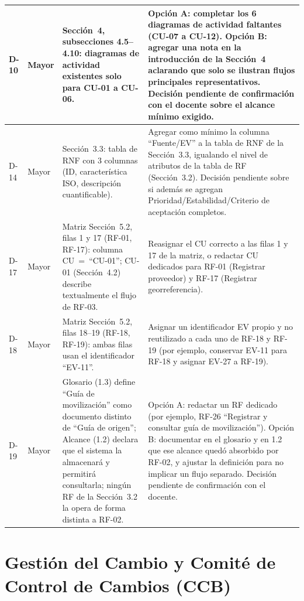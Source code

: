 \documentclass[11pt,a4paper]{article}
\begin{document}
\begin{longtable}{|p{0.8cm}|p{1.1cm}|p{5.7cm}|p{5.7cm}|}
\hline
D-10 & Mayor & Sección~4, subsecciones 4.5--4.10: diagramas de actividad existentes solo para CU-01 a CU-06. & Opción A: completar los 6 diagramas de actividad faltantes (CU-07 a CU-12). Opción B: agregar una nota en la introducción de la Sección~4 aclarando que solo se ilustran flujos principales representativos. Decisión pendiente de confirmación con el docente sobre el alcance mínimo exigido. \\
\hline
D-14 & Mayor & Sección~3.3: tabla de RNF con 3 columnas (ID, característica ISO, descripción cuantificable). & Agregar como mínimo la columna ``Fuente/EV'' a la tabla de RNF de la Sección~3.3, igualando el nivel de atributos de la tabla de RF (Sección~3.2). Decisión pendiente sobre si además se agregan Prioridad/Estabilidad/Criterio de aceptación completos. \\
\hline
D-17 & Mayor & Matriz Sección~5.2, filas 1 y 17 (RF-01, RF-17): columna CU~=~``CU-01''; CU-01 (Sección~4.2) describe textualmente el flujo de RF-03. & Reasignar el CU correcto a las filas 1 y 17 de la matriz, o redactar CU dedicados para RF-01 (Registrar proveedor) y RF-17 (Registrar georreferencia). \\
\hline
D-18 & Mayor & Matriz Sección~5.2, filas 18--19 (RF-18, RF-19): ambas filas usan el identificador ``EV-11''. & Asignar un identificador EV propio y no reutilizado a cada uno de RF-18 y RF-19 (por ejemplo, conservar EV-11 para RF-18 y asignar EV-27 a RF-19). \\
\hline
D-19 & Mayor & Glosario (1.3) define ``Guía de movilización'' como documento distinto de ``Guía de origen''; Alcance (1.2) declara que el sistema la almacenará y permitirá consultarla; ningún RF de la Sección~3.2 la opera de forma distinta a RF-02. & Opción A: redactar un RF dedicado (por ejemplo, RF-26 ``Registrar y consultar guía de movilización''). Opción B: documentar en el glosario y en 1.2 que ese alcance quedó absorbido por RF-02, y ajustar la definición para no implicar un flujo separado. Decisión pendiente de confirmación con el docente. \\
\hline
\end{longtable}

\section{Gestión del Cambio y Comité de Control de Cambios (CCB)}
\end{document}
